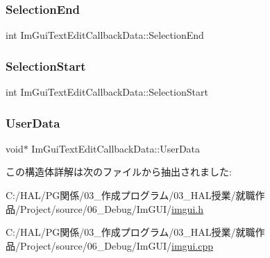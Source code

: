 \subsubsection{\texorpdfstring{Selection\+End}{SelectionEnd}}
{\footnotesize\ttfamily int Im\+Gui\+Text\+Edit\+Callback\+Data\+::\+Selection\+End}

\mbox{\label{struct_im_gui_text_edit_callback_data_a1634bec3717f7e386033051cf604efed}} 
\subsubsection{\texorpdfstring{Selection\+Start}{SelectionStart}}
{\footnotesize\ttfamily int Im\+Gui\+Text\+Edit\+Callback\+Data\+::\+Selection\+Start}

\mbox{\label{struct_im_gui_text_edit_callback_data_aaf4994a17aefa6ace9cf8f7c2fa06cf7}} 
\subsubsection{\texorpdfstring{User\+Data}{UserData}}
{\footnotesize\ttfamily void$\ast$ Im\+Gui\+Text\+Edit\+Callback\+Data\+::\+User\+Data}



この構造体詳解は次のファイルから抽出されました\+:\begin{DoxyCompactItemize}
\item 
C\+:/\+H\+A\+L/\+P\+G関係/03\+\_\+作成プログラム/03\+\_\+\+H\+A\+L授業/就職作品/\+Project/source/06\+\_\+\+Debug/\+Im\+G\+U\+I/\mbox{\hyperlink{imgui_8h}{imgui.\+h}}\item 
C\+:/\+H\+A\+L/\+P\+G関係/03\+\_\+作成プログラム/03\+\_\+\+H\+A\+L授業/就職作品/\+Project/source/06\+\_\+\+Debug/\+Im\+G\+U\+I/\mbox{\hyperlink{imgui_8cpp}{imgui.\+cpp}}\end{DoxyCompactItemize}
